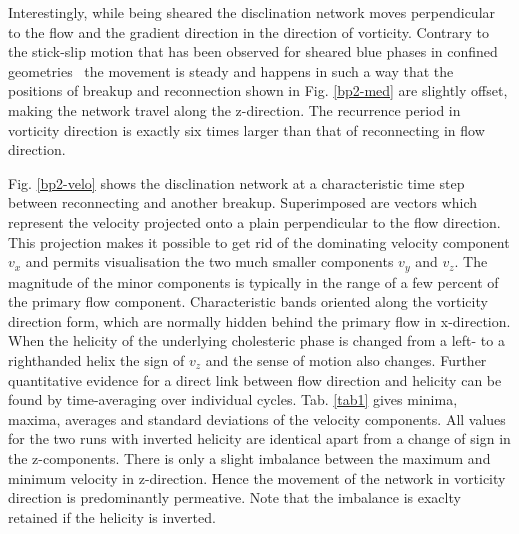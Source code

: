 \documentclass[aps,pre,reprint,superscriptaddress]{revtex4}
\begin{document}
Interestingly, while being sheared the disclination network moves perpendicular to the flow and 
the gradient direction in the direction of vorticity.
Contrary to the stick-slip motion that has been observed for sheared blue phases in confined
geometries~\cite{Henrich:2012b} the movement is steady and happens in such a way that the 
positions of breakup and reconnection shown in Fig. \ref{bp2-med} are slightly offset, 
making the network travel along the z-direction.
The recurrence period in vorticity direction is exactly six times larger than that of reconnecting in flow direction.

Fig. \ref{bp2-velo} shows the disclination network at a characteristic time step between reconnecting and another breakup.
Superimposed are vectors which represent the velocity projected onto a plain perpendicular to the flow direction.
This projection makes it possible to get rid of the dominating velocity component $v_x$ and permits visualisation the 
two much smaller components $v_y$ and $v_z$.
The magnitude of the minor components is typically in the range of a few percent of the primary flow component.
Characteristic bands oriented along the vorticity direction form, which are normally hidden behind the primary flow in x-direction.
When the helicity of the underlying cholesteric phase is changed from a left- to a righthanded helix the sign of $v_z$ 
and the sense of motion also changes.
Further quantitative evidence for a direct link between flow direction and helicity can be found by time-averaging over
individual cycles.
Tab. \ref{tab1} gives minima, maxima, averages and standard deviations of the velocity components.
All values for the two runs with inverted helicity are identical apart from a change of sign in the z-components.
There is only a slight imbalance between the maximum and minimum velocity in z-direction.
Hence the movement of the network in vorticity direction is predominantly permeative.
Note that the imbalance is exaclty retained if the helicity is inverted.
\end{document}
